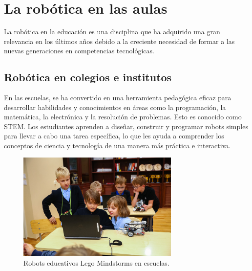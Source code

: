 \section{La robótica en las aulas}
\label{sec:segundaseccion}
La robótica en la educación es una disciplina que ha adquirido una gran relevancia en los últimos años debido a la creciente necesidad 
de formar a las nuevas generaciones en competencias tecnológicas.
\subsection{Robótica en colegios e institutos}
En las escuelas, se ha convertido en una herramienta pedagógica eficaz para desarrollar habilidades y conocimientos en áreas como la programación, 
la matemática, la electrónica y la resolución de problemas. Esto es conocido como \ac{STEM}. Los 
estudiantes aprenden a diseñar, construir y programar robots simples para llevar a cabo una tarea específica, lo que les ayuda a comprender  
los conceptos de ciencia y tecnología de una manera más práctica e interactiva.\\
\begin{figure} [h!]
  \begin{center}
    \includegraphics[width=8cm]{figs/education_robot.jpg}
  \end{center}
  \caption{Robots educativos Lego Mindstorms en escuelas.}
  \label{fig:robSecundaria}
\end{figure}\
\newpage
